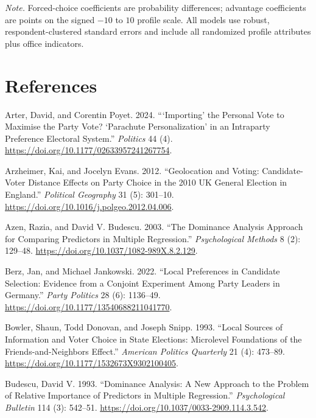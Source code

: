\documentclass[
  letterpaper,
  DIV=11,
  numbers=noendperiod]{scrartcl}
\newlength{\cslhangindent}
\newenvironment{CSLReferences}[2] %
 {\begin{list}{}{%
  \setlength{\itemindent}{0pt}
  \setlength{\leftmargin}{0pt}
  \setlength{\parsep}{0pt}
  \ifodd #1
   \setlength{\leftmargin}{\cslhangindent}
   \setlength{\itemindent}{-1\cslhangindent}
  \fi
  \setlength{\itemsep}{#2\baselineskip}}}
 {\end{list}}
\begin{document}
\emph{Note.} Forced-choice coefficients are probability differences;
advantage coefficients are points on the signed \(-10\) to \(10\)
profile scale. All models use robust, respondent-clustered standard
errors and include all randomized profile attributes plus office
indicators.

\section*{References}\label{references}

\protect{}\label{refs}
\begin{CSLReferences}{1}{1}
Arter, David, and Corentin Poyet. 2024. {``{{`Importing'}} the Personal
Vote to Maximise the Party Vote? {{`Parachute Personalization'}} in an
Intraparty Preference Electoral System.''} \emph{Politics} 44 (4).
\url{https://doi.org/10.1177/02633957241267754}.

Arzheimer, Kai, and Jocelyn Evans. 2012. {``Geolocation and Voting:
Candidate-Voter Distance Effects on Party Choice in the 2010 {UK}
General Election in England.''} \emph{Political Geography} 31 (5):
301--10. \url{https://doi.org/10.1016/j.polgeo.2012.04.006}.

Azen, Razia, and David V. Budescu. 2003. {``The Dominance Analysis
Approach for Comparing Predictors in Multiple Regression.''}
\emph{Psychological Methods} 8 (2): 129--48.
\url{https://doi.org/10.1037/1082-989X.8.2.129}.

Berz, Jan, and Michael Jankowski. 2022. {``Local Preferences in
Candidate Selection: Evidence from a Conjoint Experiment Among Party
Leaders in Germany.''} \emph{Party Politics} 28 (6): 1136--49.
\url{https://doi.org/10.1177/13540688211041770}.

Bowler, Shaun, Todd Donovan, and Joseph Snipp. 1993. {``Local Sources of
Information and Voter Choice in State Elections: Microlevel Foundations
of the Friends-and-Neighbors Effect.''} \emph{American Politics
Quarterly} 21 (4): 473--89.
\url{https://doi.org/10.1177/1532673X9302100405}.

Budescu, David V. 1993. {``Dominance Analysis: A New Approach to the
Problem of Relative Importance of Predictors in Multiple Regression.''}
\emph{Psychological Bulletin} 114 (3): 542--51.
\url{https://doi.org/10.1037/0033-2909.114.3.542}.


\end{CSLReferences}
\end{document}
